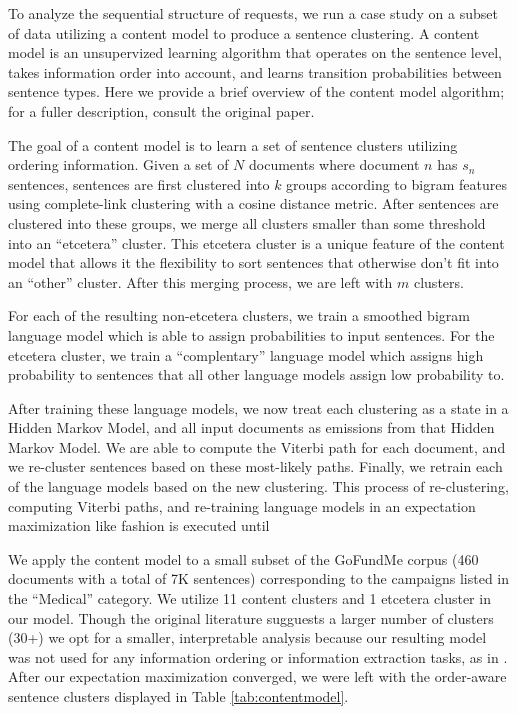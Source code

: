 \documentclass[letterpaper]{article}
\begin{document}
To analyze the sequential structure of requests, we run a case study on a subset of data utilizing a content model \cite{barzilay2004catching} to produce a sentence clustering. A content model is an unsupervized learning algorithm that operates on the sentence level, takes information order into account, and learns transition probabilities between sentence types. Here we provide a brief overview of the content model algorithm; for a fuller description, consult the original paper.

The goal of a content model is to learn a set of sentence clusters utilizing ordering information. Given a set of $N$ documents where document $n$ has $s_n$ sentences, sentences are first clustered into $k$ groups according to bigram features using complete-link clustering with a cosine distance metric. After sentences are clustered into these groups, we merge all clusters smaller than some threshold into an ``etcetera'' cluster. This etcetera cluster is a unique feature of the content model that allows it the flexibility to sort sentences that otherwise don't fit into an ``other'' cluster. After this merging process, we are left with $m$ clusters. 

For each of the resulting non-etcetera clusters, we train a smoothed bigram language model which is able to assign probabilities to input sentences. For the etcetera cluster, we train a ``complentary'' language model which assigns high probability to sentences that all other language models assign low probability to.

After training these language models, we now treat each clustering as a state in a Hidden Markov Model, and all input documents as emissions from that Hidden Markov Model. We are able to compute the Viterbi path for each document, and we re-cluster sentences based on these most-likely paths. Finally, we retrain each of the language models based on the new clustering. This process of re-clustering, computing Viterbi paths, and re-training language models in an expectation maximization like fashion is executed until 

We apply the content model to a small subset of the GoFundMe corpus (460 documents with a total of 7K sentences) corresponding to the campaigns listed in the ``Medical'' category. We utilize 11 content clusters and 1 etcetera cluster in our model. Though the original literature sugguests a larger number of clusters (30+) we opt for a smaller, interpretable analysis because our resulting model was not used for any information ordering or information extraction tasks, as in \cite{barzilay2004catching}. After our expectation maximization converged, we were left with the order-aware sentence clusters displayed in Table \ref{tab:contentmodel}.
\end{document}
